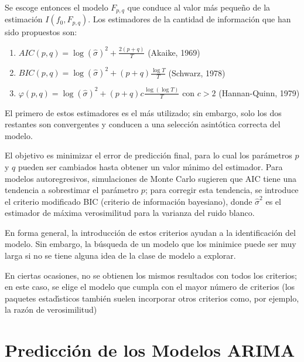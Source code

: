 Se escoge entonces el modelo $F_{p,q}$ que conduce al valor m\'{a}s 
peque\~{n}o de la estimaci\'{o}n $I\left( f_{0},F_{p,q} \right)$. Los 
estimadores de la cantidad de informaci\'{o}n que han sido propuestos son:

\begin{enumerate}
 \item $AIC\left( p,q \right)=\log{(\widehat{\sigma })}^{2}+\frac{2(p+q)}{T}$ (Akaike, 1969)
 \item $BIC\left( p,q \right)=\log{(\widehat{\sigma 
})}^{2}+(p+q)\frac{\log  T}{T}$ (Schwarz, 1978)
 \item $\varphi \left( p,q \right)=\log{(\widehat{\sigma })}^{2}+\left( p+q 
\right)c\frac{\log\left( \log  T \right)}{T} $ con  $c>2$ (Hannan-Quinn, 1979)
\end{enumerate}

El primero de estos estimadores es el m\'{a}s utilizado; sin embargo, solo 
los dos restantes son convergentes y conducen a una selecci\'{o}n 
asint\'{o}tica correcta del modelo.

El objetivo es minimizar el error de predicci\'{o}n final, para lo cual los 
par\'{a}metros $p$ y $q$ pueden ser cambiados hasta obtener un valor m\'{\i}nimo 
del estimador. Para modelos autoregresivos, simulaciones de Monte Carlo 
sugieren que AIC tiene una tendencia a sobrestimar el par\'{a}metro $p$; para 
corregir esta tendencia, se introduce el criterio modificado BIC (criterio 
de informaci\'{o}n bayesiano), donde $\widehat{\sigma }^{2}$ es el estimador de 
m\'{a}xima verosimilitud para la varianza del ruido blanco.

En forma general, la introducci\'{o}n de estos criterios ayudan a la 
identificaci\'{o}n del modelo. Sin embargo, la b\'{u}squeda de un modelo que 
los minimice puede ser muy larga si no se tiene alguna idea de la clase de 
modelo a explorar.

\begin{observacion}
En ciertas ocasiones, no se obtienen los mismos resultados con todos los criterios; en este caso, se elige el modelo que cumpla con el mayor n\'{u}mero de criterios (los paquetes estad\'{\i}sticos tambi\'{e}n suelen incorporar otros criterios como, por 
ejemplo, la raz\'{o}n de verosimilitud) 
\end{observacion}



\section{Predicci\'{o}n de los Modelos ARIMA}

